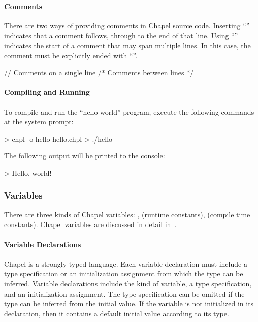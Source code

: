 \paragraph{Comments} 
There are two ways of providing comments in Chapel source code.
Inserting ``\chpl{//}'' indicates that a comment follows, through to  
the end of that line.  Using ``\chpl{/*}'' indicates the start of a comment that
may span multiple lines.  In this case, the comment must be
explicitly ended with ``\chpl{*/}''.
\begin{chapel}
// Comments on a single line
/* Comments
   between lines */
\end{chapel}

\paragraph{Compiling and Running} 
To compile and run the ``hello world'' program, execute the 
following commands at the system prompt:
\begin{commandline} 
> chpl -o hello hello.chpl
> ./hello
\end{commandline}
The following output will be printed to the console:
\begin{commandline}
> Hello, world!
\end{commandline}

\subsubsection{Variables}

There are three kinds of Chapel variables: ,
 (runtime constants),  (compile time constants).
Chapel variables are discussed in detail in~.

\paragraph{Variable Declarations}
Chapel is a strongly typed language.  Each variable declaration
must include a type specification or an initialization assignment 
from which the type can be inferred.  
Variable declarations include the kind of variable, a type specification,
and an initialization assignment.  The type specification can be
omitted if the type can be inferred from the initial value.  If the
variable is not initialized in its declaration, then it contains a
default initial value according to its type.

